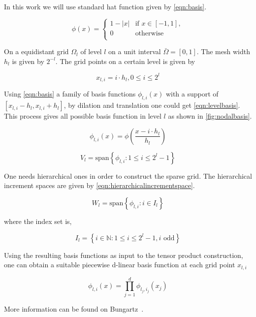 In this work we will use standard hat function given by \cref{eqn:basis}.

\begin{equation}
    \phi(x ) = \left\{
    \begin{array}{ll}
        1-|x| & \text{if } x \in [-1,1] , \\
        0     & \text{otherwise}          \\
    \end{array}
    \right.
    \label{eqn:basis}
\end{equation}

On a equidistant grid \(\Omega_l \) of level \( l\) on a unit interval \(\bar{\Omega} = [0,1]\). The mesh width \(h_l\) is given by \(2^{-l} \). The grid points on a certain level is given by

\begin{equation}
    x_{l,i} = i \cdot h_l, 0 \leq i \leq 2^l
\end{equation}

Using \cref{eqn:basis} a family of basis functions \(\phi_{l,i}(x)\) with a support of \([x_{l,i}-h_l,x_{l,i}+h_l]\), by dilation and translation one could get \cref{eqn:levelbasis}. This process gives all possible basis function in level \(l\) as shown in \cref{fig:nodalbasis}.

\begin{equation}
    \phi_{l,i}(x) = \phi \left(\frac{x-i\cdot h_l}{h_l}\right)
\end{equation}

\begin{equation}
    V_l = \text{span} \left\{ \phi_{l,i} : 1 \leq i \leq 2^l-1 \right\}
    \label{eqn:levelbasis}
\end{equation}

One needs hierarchical ones in order to construct the sparse grid. The hierarchical increment spaces are given by \cref{eqn:hierarchicalincrementspace}.

\begin{equation}
    W_l = \text{span} \left\{ \phi_{l,i} : i \in I_l\right\}
    \label{eqn:hierarchicalincrementspace}
\end{equation}

where the index set is,

\begin{equation}
    I_l = \left\{ i \in \mathbb{N}: 1 \leq i \leq 2^l-1 , i \text{ odd} \right\}
\end{equation}

Using the resulting basis functions as input to the tensor product construction, one can obtain a suitable piecewise d-linear basis function at each grid point \(x_{l,i}\)

\begin{equation}
    \phi_{l,i}(x) = \prod_{j=1}^d \phi_{l_j,i_j}(x_j)
\end{equation}

More information can be found on Bungartz~\cite{Bungartz2004}.
